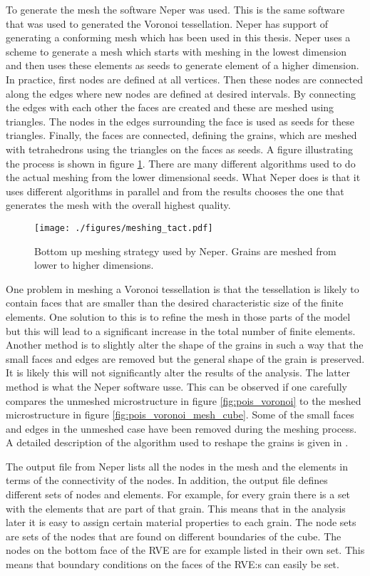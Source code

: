 \documentclass[meshing_micro.tex]{subfiles}
\begin{document}
To generate the mesh the software Neper\cite{Quey20111729} was used. 
This is the same software that was used to generated the Voronoi tessellation. Neper has support of generating a conforming mesh which has been used in this thesis. Neper uses a scheme to generate a mesh which starts with meshing in the lowest dimension and then uses these elements as seeds to generate element of a higher dimension.  In practice, first nodes are defined at all vertices. Then these nodes are connected along the edges where new nodes are defined at desired intervals. 
By connecting the edges with each other the faces are created and these are meshed using triangles. The nodes in the edges surrounding the face is used as seeds for these triangles. Finally, the faces are connected, defining the grains, which are meshed with tetrahedrons using the triangles on the faces as seeds. A figure illustrating the process is shown in figure \ref{fig:mesh_strat}. There are many different algorithms used to do the actual meshing from the lower dimensional seeds. 
What Neper does is that it uses different algorithms in parallel and from the results chooses the one that generates the mesh with the overall highest quality.

 \begin{figure}
\centering
  \texttt{[image: ./figures/meshing\_tact.pdf]}
\caption{Bottom up meshing strategy used by Neper. Grains are meshed from lower to higher dimensions.}
\label{fig:mesh_strat}
\end{figure}


One problem in meshing a Voronoi tessellation is that the tessellation is likely to contain faces that are smaller than the desired characteristic size of the finite elements. One solution to this is to refine the mesh in those parts of the model but this will lead to a significant increase in the total number of finite elements.  Another method is to slightly alter the shape of the grains in such a way that the small faces and edges are removed but the general shape of the grain is preserved. It is likely this will not significantly alter the results of the analysis. The latter method is what the Neper software usse. This can be observed if one carefully compares the unmeshed microstructure in figure \ref{fig:pois_voronoi} to the meshed microstructure in figure \ref{fig:pois_voronoi_mesh_cube}. Some of the small faces and edges in the unmeshed case have been removed during the meshing process. A detailed description of the algorithm used to reshape the grains is given in \cite{Quey20111729}.
 
The output file from Neper lists all the nodes in the mesh and the elements in terms of the connectivity of the nodes. In addition, the output file defines different sets of nodes and elements. For example, for every grain there is a set with the elements that are part of that grain. This means that in the analysis later it is easy to assign certain material properties to each grain. The node sets are sets of the nodes that are found on different boundaries of the cube. The nodes on the bottom face of the RVE are for example listed in their own set. This means that boundary conditions on the faces of the RVE:s can easily be set.
\end{document}
